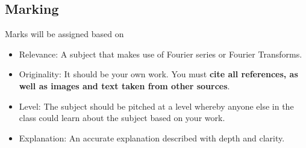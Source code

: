\subsection{Marking}
Marks will be assigned based on
\begin{itemize}
    \item Relevance: A subject that makes use of Fourier series or Fourier Transforms.
    \item Originality: It should be your own work. You must \textbf{cite all references, as well as images and text taken from other sources}.
    \item Level: The subject should be pitched at a level whereby anyone else in the class could learn about the subject based on your work.
    \item Explanation: An accurate explanation described with depth and clarity.
\end{itemize}
